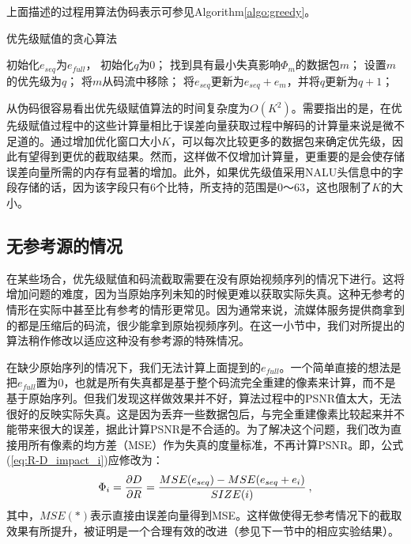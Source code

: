 上面描述的过程用算法伪码表示可参见Algorithm\ref{algo:greedy}。

\begin{algorithm}
	\vspace{10pt}
	\caption{优先级赋值的贪心算法}
	\label{algo:greedy}
	\begin{algorithmic}
		\STATE 初始化$e_{seq}$为$e_{full}$， 初始化$q$为0；
		\STATE 找到具有最小失真影响$\Phi_m$的数据包$m$；
		\ENDFOR
		\STATE 设置$m$的优先级为$q$；
		\STATE 将$m$从码流中移除；
		\STATE 将$e_{seq}$更新为$e_{seq} + e_m$，并将$q$更新为$q+1$；
		\ENDWHILE
	\end{algorithmic}
	\vspace{10pt}
\end{algorithm}

从伪码很容易看出优先级赋值算法的时间复杂度为$O(K^2)$。需要指出的是，在优先级赋值过程中的这些计算量相比于误差向量获取过程中解码的计算量来说是微不足道的。通过增加优化窗口大小$K$，可以每次比较更多的数据包来确定优先级，因此有望得到更优的截取结果。然而，这样做不仅增加计算量，更重要的是会使存储误差向量所需的内存有显著的增加。此外，如果优先级值采用NALU头信息中的字段存储的话，因为该字段只有6个比特，所支持的范围是0～63，这也限制了$K$的大小。

\subsection{无参考源的情况}
\label{subsec:noref}

在某些场合，优先级赋值和码流截取需要在没有原始视频序列的情况下进行。这将增加问题的难度，因为当原始序列未知的时候更难以获取实际失真。这种无参考的情形在实际中甚至比有参考的情形更常见。因为通常来说，流媒体服务提供商拿到的都是压缩后的码流，很少能拿到原始视频序列。在这一小节中，我们对所提出的算法稍作修改以适应这种没有参考源的特殊情况。

在缺少原始序列的情况下，我们无法计算上面提到的$e_{full}$。一个简单直接的想法是把$e_{full}$置为0，也就是所有失真都是基于整个码流完全重建的像素来计算，而不是基于原始序列。但我们发现这样做效果并不好，算法过程中的PSNR值太大，无法很好的反映实际失真。这是因为丢弃一些数据包后，与完全重建像素比较起来并不能带来很大的误差，据此计算PSNR是不合适的。为了解决这个问题，我们改为直接用所有像素的均方差（MSE）作为失真的度量标准，不再计算PSNR。即，公式(\ref{eq:R-D_impact_i})应修改为：
\begin{equation}
\vspace{10pt}
\label{eq:R-D_impact_i_noref}
\Phi_i = \dfrac{\partial D}{\partial R} = \dfrac{MSE(e_{seq}) - MSE(e_{seq} + e_i)}{SIZE(i)} \: ,
\end{equation}
其中，$MSE(*)$表示直接由误差向量得到MSE。这样做使得无参考情况下的截取效果有所提升，被证明是一个合理有效的改进（参见下一节中的相应实验结果）。

